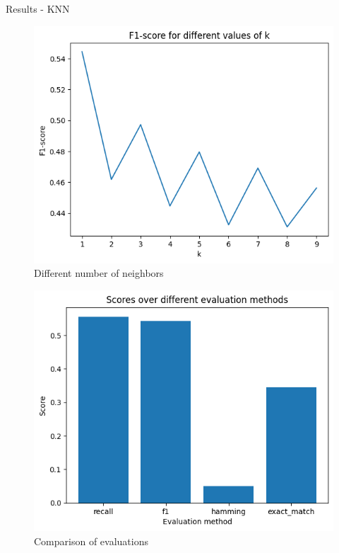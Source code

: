\documentclass{beamer}
\begin{document}
\begin{frame}[t]{Results - KNN}
 {
	\vspace{-3mm}
	\begin{figure}[h]
		\caption{Different number of neighbors}
		\centering
		\includegraphics[width=0.73\linewidth]{images/KNN/f1_score_over_k.png}
	\end{figure}
}

\pause
{} {
	\vspace{-3mm}
	\begin{figure}[h]
		\caption{Comparison of evaluations}
		\centering
		\includegraphics[width=0.73\linewidth]{images/KNN/score_every_eval.png}
	\end{figure}
}
\end{frame}
\end{document}
